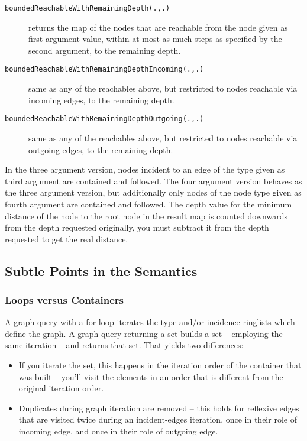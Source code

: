 \begin{description}
\item[\texttt{boundedReachableWithRemainingDepth(.,.)}] returns the map of the nodes that are reachable from the node given as first argument value, within at most as much steps as specified by the second argument, to the remaining depth.
\item[\texttt{boundedReachableWithRemainingDepthIncoming(.,.)}] same as any of the reachables above, but restricted to nodes reachable via incoming edges, to the remaining depth.
\item[\texttt{boundedReachableWithRemainingDepthOutgoing(.,.)}] same as any of the reachables above, but restricted to nodes reachable via outgoing edges, to the remaining depth.
\end{description}

In the three argument version, nodes incident to an edge of the type given as third argument are contained and followed.
The four argument version behaves as the three argument version, but additionally only nodes of the node type given as fourth argument are contained and followed.
The depth value for the minimum distance of the node to the root node in the result map is counted downwards from the depth requested originally, you must subtract it from the depth requested to get the real distance.

\subsection{Subtle Points in the Semantics}\label{sub:subtle}

\subsubsection*{Loops versus Containers}
A graph query with a for loop iterates the type and/or incidence ringlists which define the graph.
A graph query returning a set builds a set -- employing the same iteration -- and returns that set.
That yields two differences:
\begin{itemize}
	\item If you iterate the set, this happens in the iteration order of the container that was built -- you'll visit the elements in an order that is different from the original iteration order.
	\item Duplicates during graph iteration are removed -- this holds for reflexive edges that are visited twice during an incident-edges iteration, once in their role of incoming edge, and once in their role of outgoing edge.
\end{itemize}

